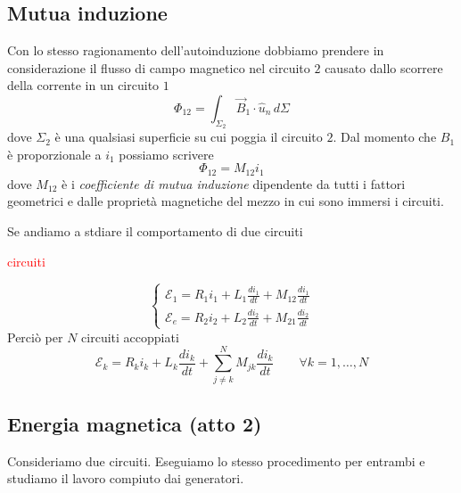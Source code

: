 \documentclass[x11names]{report}
\begin{document}
\subsection{Mutua induzione}
Con lo stesso ragionamento dell'autoinduzione dobbiamo prendere in considerazione il flusso di campo magnetico nel circuito \(2\) causato dallo scorrere della corrente in un circuito \(1\)
\[
\Phi_{12} = \int_{\Sigma_2}\vec{B}_1 \cdot \hat{u}_{n} \, d\Sigma
\]
dove \(\Sigma_2\) è una qualsiasi superficie su cui poggia il circuito \(2\). Dal momento che \(B_1\) è proporzionale a \(i_1\) possiamo scrivere 
\[
\Phi_{12} = M_{12}i_1
\]
dove \(M_{12}\) è i \textit{coefficiente di mutua induzione} dipendente da tutti i fattori geometrici e dalle proprietà magnetiche del mezzo in cui sono immersi i circuiti. 

Se andiamo a stdiare il comportamento di due circuiti 
\begin{center}
	\textcolor{red}{circuiti}
\end{center}
\[
\begin{cases}
	\mathcal{E}_1 = R_1i_1 + L_1\frac{di_1}{dt} + M_{12}\frac{di_1}{dt} \\
	\mathcal{E}_e = R_2i_2 + L_2\frac{di_2}{dt} + M_{21}\frac{di_2}{dt}
\end{cases}
\]
Perciò per \(N\) circuiti accoppiati
\begin{equation}
	\mathcal{E}_k = R_ki_k + L_k\frac{di_k}{dt} + \sum_{j\neq k}^{N}M_{jk}\frac{di_k}{dt} \qquad \forall k = 1,\dots,N
\end{equation}
\subsection{Energia magnetica (atto 2)} 
Consideriamo due circuiti. Eseguiamo lo stesso procedimento per entrambi e studiamo il lavoro compiuto dai generatori. 
\end{document}
